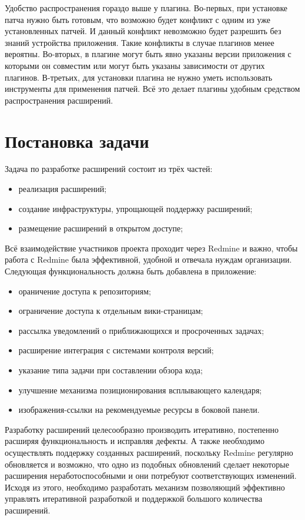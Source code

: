 Удобство распространения гораздо выше у плагина. Во-первых, при установке патча
нужно быть готовым, что возможно будет конфликт с одним из уже установленных
патчей. И данный конфликт невозможно будет разрешить без знаний устройства
приложения.
Такие конфликты в случае плагинов менее вероятны. Во-вторых, в плагине могут
быть явно указаны версии приложения с которыми он совместим или могут быть
указаны зависимости от других плагинов. В-третьих, для установки плагина не
нужно уметь использовать инструменты для применения патчей. Всё это делает
плагины удобным средством распространения расширений.


\section{Постановка задачи}
Задача по разработке расширений состоит из трёх частей:
\begin{itemize}
  \item реализация расширений;
  \item создание инфраструктуры, упрощающей поддержку расширений;
  \item размещение расширений в открытом доступе;
\end{itemize}
   
Всё взаимодействие участников проекта проходит через Redmine и важно, чтобы
работа с Redmine была эффективной, удобной и отвечала нуждам организации.
Следующая функциональность должна быть добавлена в приложение:
\begin{itemize}
  \item ораничение доступа к репозиториям;
  \item ограничение доступа к отдельным вики-страницам;
  \item рассылка уведомлений о приближающихся и просроченных
  задачах;
  \item расширение интеграция с системами контроля версий; 
  \item указание типа задачи при составлении обзора кода;
  \item улучшение механизма позиционирования всплывающего календаря;
  \item изображения-ссылки на рекомендуемые ресурсы в боковой панели.
\end{itemize}

Разработку расширений целесообразно производить итеративно, постепенно расширяя
функциональность и исправляя дефекты. А также необходимо осуществлять поддержку
созданных расширений, поскольку Redmine регулярно обновляется и возможно, что
одно из подобных обновлений сделает некоторые расширения неработоспособными и
они потребуют соответствующих изменений. Исходя из этого, необходимо
разработать механизм позволяющий эффективно управлять итеративной разработкой и
поддержкой большого количества расширений.

